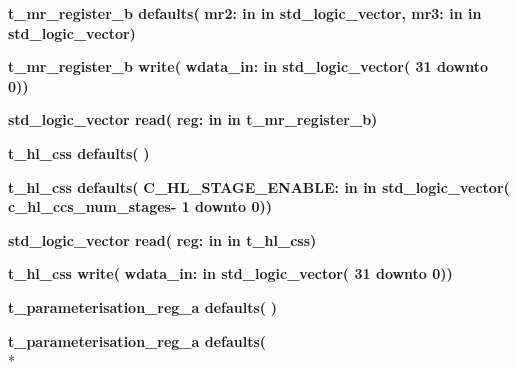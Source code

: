\begin{DoxyCompactItemize}
\item 
{\bfseries {\bfseries \textcolor{vhdlchar}{t\+\_\+mr\+\_\+register\+\_\+b}\textcolor{vhdlchar}{ }}} {\bf defaults}{\bfseries  ( }{\bfseries \textcolor{vhdlchar}{mr2\+: }\textcolor{stringliteral}{in }\textcolor{vhdlchar}{in std\+\_\+logic\+\_\+vector}}{\bfseries  , \textcolor{vhdlchar}{mr3\+: }\textcolor{stringliteral}{in }\textcolor{vhdlchar}{in std\+\_\+logic\+\_\+vector}}{\bfseries  )} 
\item 
{\bfseries {\bfseries \textcolor{vhdlchar}{t\+\_\+mr\+\_\+register\+\_\+b}\textcolor{vhdlchar}{ }}} {\bf write}{\bfseries  ( }{\bfseries \textcolor{vhdlchar}{wdata\+\_\+in\+: }\textcolor{stringliteral}{in }\textcolor{vhdlchar}{std\+\_\+logic\+\_\+vector( 31 downto  0)}}{\bfseries  )} 
\item 
{\bfseries {\bfseries \textcolor{comment}{std\+\_\+logic\+\_\+vector}\textcolor{vhdlchar}{ }}} {\bf read}{\bfseries  ( }{\bfseries \textcolor{vhdlchar}{reg\+: }\textcolor{stringliteral}{in }\textcolor{vhdlchar}{in t\+\_\+mr\+\_\+register\+\_\+b}}{\bfseries  )} 
\item 
{\bfseries {\bfseries \textcolor{vhdlchar}{t\+\_\+hl\+\_\+css}\textcolor{vhdlchar}{ }}} {\bf defaults}{\bfseries  ( }{\bfseries  )} 
\item 
{\bfseries {\bfseries \textcolor{vhdlchar}{t\+\_\+hl\+\_\+css}\textcolor{vhdlchar}{ }}} {\bf defaults}{\bfseries  ( }{\bfseries \textcolor{vhdlchar}{C\+\_\+\+H\+L\+\_\+\+S\+T\+A\+G\+E\+\_\+\+E\+N\+A\+B\+L\+E\+: }\textcolor{stringliteral}{in }\textcolor{vhdlchar}{in std\+\_\+logic\+\_\+vector(   c\+\_\+hl\+\_\+ccs\+\_\+num\+\_\+stages-\/ 1 downto  0)}}{\bfseries  )} 
\item 
{\bfseries {\bfseries \textcolor{comment}{std\+\_\+logic\+\_\+vector}\textcolor{vhdlchar}{ }}} {\bf read}{\bfseries  ( }{\bfseries \textcolor{vhdlchar}{reg\+: }\textcolor{stringliteral}{in }\textcolor{vhdlchar}{in t\+\_\+hl\+\_\+css}}{\bfseries  )} 
\item 
{\bfseries {\bfseries \textcolor{vhdlchar}{t\+\_\+hl\+\_\+css}\textcolor{vhdlchar}{ }}} {\bf write}{\bfseries  ( }{\bfseries \textcolor{vhdlchar}{wdata\+\_\+in\+: }\textcolor{stringliteral}{in }\textcolor{vhdlchar}{std\+\_\+logic\+\_\+vector( 31 downto  0)}}{\bfseries  )} 
\item 
{\bfseries {\bfseries \textcolor{vhdlchar}{t\+\_\+parameterisation\+\_\+reg\+\_\+a}\textcolor{vhdlchar}{ }}} {\bf defaults}{\bfseries  ( }{\bfseries  )} 
\item 
{\bfseries {\bfseries \textcolor{vhdlchar}{t\+\_\+parameterisation\+\_\+reg\+\_\+a}\textcolor{vhdlchar}{ }}} {\bf defaults}{\bfseries  ( }\\*

\end{DoxyCompactItemize}
